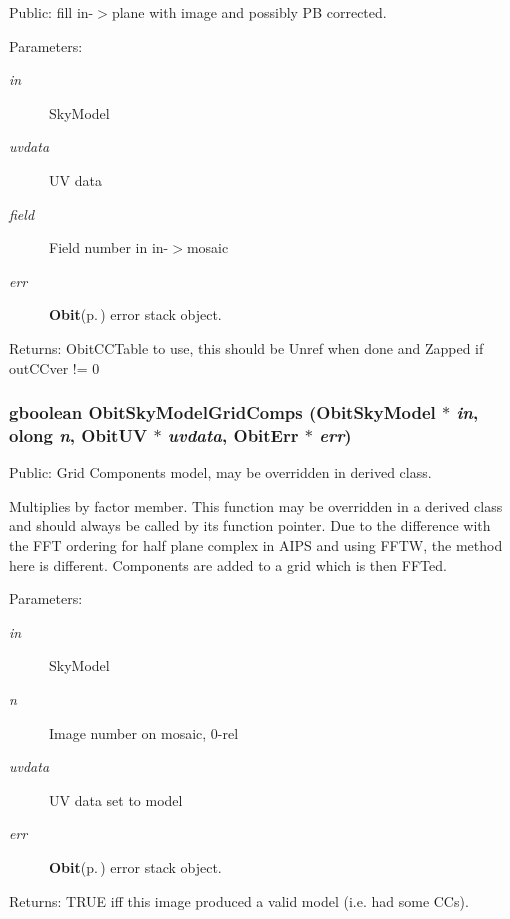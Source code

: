 Public: fill in-$>$plane with image and possibly PB corrected. 

\begin{Desc}
\item[Parameters:]
\begin{description}
\item[{\em in}]Sky\-Model \item[{\em uvdata}]UV data \item[{\em field}]Field number in in-$>$mosaic \item[{\em err}]{\bf Obit}{\rm (p.\,\pageref{structObit})} error stack object. \end{description}
\end{Desc}
\begin{Desc}
\item[Returns:]Obit\-CCTable to use, this should be Unref when done and Zapped if out\-CCver != 0 \end{Desc}
\subsubsection{\setlength{\rightskip}{0pt plus 5cm}gboolean Obit\-Sky\-Model\-Grid\-Comps ({\bf Obit\-Sky\-Model} $\ast$ {\em in}, {\bf olong} {\em n}, {\bf Obit\-UV} $\ast$ {\em uvdata}, {\bf Obit\-Err} $\ast$ {\em err})}\label{ObitSkyModel_8h_a63}


Public: Grid Components model, may be overridden in derived class. 

Multiplies by factor member. This function may be overridden in a derived class and should always be called by its function pointer. Due to the difference with the FFT ordering for half plane complex in AIPS and using FFTW, the method here is different. Components are added to a grid which is then FFTed. \begin{Desc}
\item[Parameters:]
\begin{description}
\item[{\em in}]Sky\-Model \item[{\em n}]Image number on mosaic, 0-rel \item[{\em uvdata}]UV data set to model \item[{\em err}]{\bf Obit}{\rm (p.\,\pageref{structObit})} error stack object. \end{description}
\end{Desc}
\begin{Desc}
\item[Returns:]TRUE iff this image produced a valid model (i.e. had some CCs). \end{Desc}
